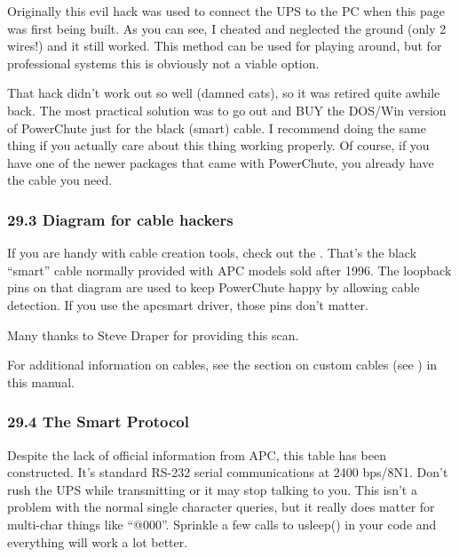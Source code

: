 {{{{{{{{{{{{{{{{{Originally this evil hack was used to connect the UPS to the PC when this page
was first being built. As you can see, I cheated and neglected the ground
(only 2 wires!) and it still worked. This method can be used for playing
around, but for professional systems this is obviously not a viable option.  

That hack didn't work out so well (damned cats), so it was retired quite
awhile back. The most practical solution was to go out and BUY the DOS/Win
version of PowerChute just for the black (smart) cable. I recommend doing the
same thing if you actually care about this thing working properly. Of course,
if you have one of the newer packages that came with PowerChute, you already
have the cable you need. 

\label{Diagram-for-cable-hackers}

\subsubsection*{29.3 Diagram for cable hackers}

If you are handy with cable creation tools, check out the 
. That's the black
``smart'' cable normally provided with APC models sold after 1996. The
loopback pins on that diagram are used to keep PowerChute happy by allowing
cable detection. If you use the 
 apcsmart driver, those pins don't
matter.  

Many thanks to Steve Draper for providing this scan.  

For additional information on cables, see the section on custom cables (see 
) in this manual. 

\label{The-Smart-Protocol}

\subsubsection*{29.4 The Smart Protocol}

Despite the lack of official information from APC, this table has been
constructed. It's standard RS-232 serial communications at 2400 bps/8N1. Don't
rush the UPS while transmitting or it may stop talking to you. This isn't a
problem with the normal single character queries, but it really does matter
for multi-char things like ``@000''. Sprinkle a few calls to usleep() in your
code and everything will work a lot better.  

}}}}}}}}}}}}}}}}}
